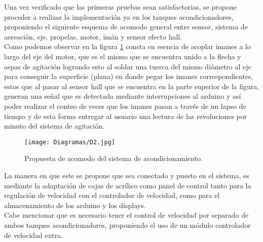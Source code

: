 \documentclass[11pt,letter
								]
								{article}
\begin{document}
Una vez verificado que las primeras pruebas sean satisfactorias, se propone  proceder  a realizar la implementación ya  en los tanques acondicionadores, proponiendo el siguiente esquema de acomodo general entre sensor, sistema de aereación, eje, propelas, motor, imán y sensor efecto hall.\\


Como podemos observar en la figura \ref{D1} consta  en esencia de acoplar imanes a lo largo del eje del motor, que es el mismo que se encuentra unido a la flecha y aspas de agitación logrando esto al   soldar  una tuerca del mismo diámetro al eje para conseguir la superficie (plana) en donde pegar los imanes correspondientes, estos que al pasar al sensor hall que se encuentra en la parte superior de la figura, generan una señal que es detectada mediante interrupciones al arduino y así poder realizar el conteo de veces que los imanes pasan a través de un lapso de tiempo y de esta forma entregar al usuario una lectura de las revoluciones por minuto del sistema de agitación.\\

\begin{figure}[H]
\centering
\texttt{[image: Diagramas/D2.jpg]}
\caption{Propuesta de acomodo del sistema de acondicionamiento.}
\label{D1}
\end{figure}
La manera en que este se propone que sea  conectado y puesto en el sistema, es mediante la adaptación de cajas de acrílico como panel de control tanto para la regulación de velocidad con el controlador de velocidad, como para el almacenamiento de los arduino y los displays.\\

Cabe mencionar que es necesario tener el control de velocidad por separado de ambos tanques acondicionadores, proponiendo el uso de un módulo controlador de velocidad extra.
%
%
%
\end{document}
